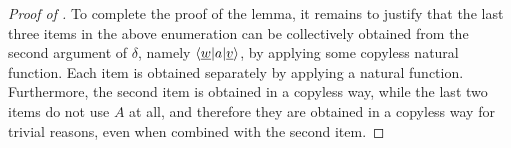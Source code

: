 \begin{proof}[Proof of ]
     To complete the proof of the lemma, it remains to justify that the last three items in the above enumeration can be collectively obtained from the second argument of $\delta$, namely $\langle \underline w|a|\underline v \rangle$, by applying some copyless natural function. Each item is obtained separately by applying a natural function. Furthermore, the second item is obtained in a copyless way, while the last two items do not use $A$ at all, and therefore they are obtained in a copyless way for trivial reasons, even when combined with the second item.
\end{proof}


